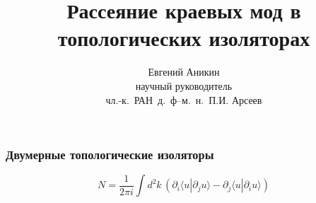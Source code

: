 \documentclass{beamer}
\title{Рассеяние краевых мод в топологических изоляторах}
\author[Е. Аникин]{Евгений Аникин \\
	научный руководитель\\
	чл.-к.~РАН~д.~ф--м.~н.~П.И. Арсеев}
\institute{ФИАН им. Лебедева}
\date{}
\begin{document}
\begin{frame}
    \titlepage
\end{frame}

\begin{frame}
    \frametitle{Двумерные топологические изоляторы}
    \begin{equation}
        \label{TKNN}
        N = \frac{1}{2\pi i} 
            \int d^2 k\, \left(\partial_i \langle u | \partial_j u \rangle -
            \partial_j \langle u | \partial_i u \rangle \right)
    \end{equation}
\end{frame}
\end{document}

